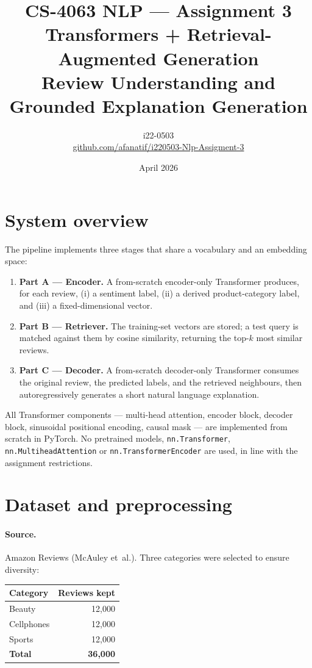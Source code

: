 \documentclass[11pt,a4paper]{article}
\title{\textbf{CS-4063 NLP --- Assignment 3}\\
       \large Transformers + Retrieval-Augmented Generation\\[2pt]
       \normalsize Review Understanding and Grounded Explanation Generation}
\author{i22-0503 \\ \small\href{https://github.com/afanatif/i220503-Nlp-Assigment-3}{github.com/afanatif/i220503-Nlp-Assigment-3}}
\date{April 2026}
\begin{document}
\maketitle

\section{System overview}
The pipeline implements three stages that share a vocabulary and an embedding
space:
\begin{enumerate}[leftmargin=*]
  \item \textbf{Part A --- Encoder.} A from-scratch encoder-only Transformer
        produces, for each review, (i) a sentiment label, (ii) a derived
        product-category label, and (iii) a fixed-dimensional vector.
  \item \textbf{Part B --- Retriever.} The training-set vectors are stored;
        a test query is matched against them by cosine similarity, returning
        the top-$k$ most similar reviews.
  \item \textbf{Part C --- Decoder.} A from-scratch decoder-only Transformer
        consumes the original review, the predicted labels, and the
        retrieved neighbours, then autoregressively generates a short natural
        language explanation.
\end{enumerate}
All Transformer components --- multi-head attention, encoder block, decoder
block, sinusoidal positional encoding, causal mask --- are implemented from
scratch in PyTorch. No pretrained models, \texttt{nn.Transformer},
\texttt{nn.MultiheadAttention} or \texttt{nn.TransformerEncoder} are used,
in line with the assignment restrictions.

\section{Dataset and preprocessing}
\paragraph{Source.} Amazon Reviews (McAuley et~al.). Three categories were
selected to ensure diversity:

\begin{center}
\begin{tabular}{lr}
\toprule
Category & Reviews kept \\
\midrule
Beauty       & 12{,}000 \\
Cellphones   & 12{,}000 \\
Sports       & 12{,}000 \\
\midrule
\textbf{Total} & \textbf{36{,}000} \\
\bottomrule
\end{tabular}
\end{center}
\end{document}
